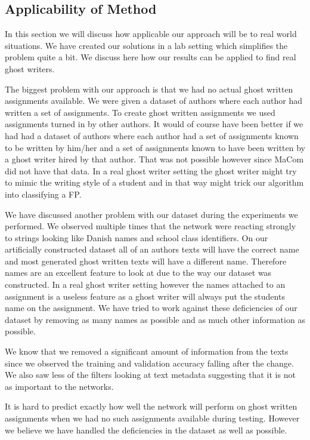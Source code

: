 \subsection{Applicability of Method}

In this section we will discuss how applicable our approach will be to real
world situations. We have created our solutions in a lab setting which
simplifies the problem quite a bit. We discuss here how our results can be
applied to find real ghost writers.

The biggest problem with our approach is that we had no actual ghost written
assignments available. We were given a dataset of authors where each author had
written a set of assignments. To create ghost written assignments we used
assignments turned in by other authors. It would of course have been better if
we had had a dataset of authors where each author had a set of assignments known
to be written by him/her and a set of assignments known to have been written by
a ghost writer hired by that author. That was not possible however since MaCom
did not have that data. In a real ghost writer setting the ghost writer might
try to mimic the writing style of a student and in that way might trick our
algorithm into classifying a \gls{FP}.

We have discussed another problem with our dataset during the experiments we
performed. We observed multiple times that the network were reacting strongly
to strings looking like Danish names and school class identifiers. On our
artificially constructed dataset all of an authors texts will have the correct
name and most generated ghost written texts will have a different name.
Therefore names are an excellent feature to look at due to the way our dataset
was constructed. In a real ghost writer setting however the names attached to an
assignment is a useless feature as a ghost writer will always put the students
name on the assignment. We have tried to work against these deficiencies of our
dataset by removing as many names as possible and as much other information as
possible.

We know that we removed a significant amount of information from the texts since
we observed the training and validation accuracy falling after the change. We
also saw less of the filters looking at text metadata suggesting that it is not
as important to the networks.

It is hard to predict exactly how well the network will perform on ghost written
assignments when we had no such assignments available during testing. However we
believe we have handled the deficiencies in the dataset as well as possible.


